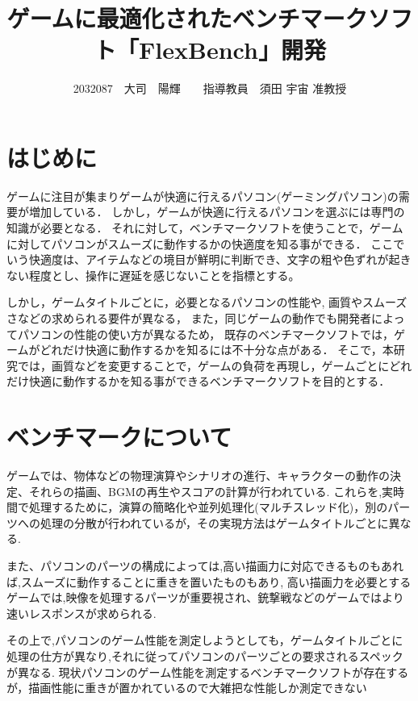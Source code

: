 \documentclass[twocolumn,10pt,a4j]{ltjsarticle}
\title{ゲームに最適化されたベンチマークソフト「FlexBench」開発}
\author{2032087　大司　陽輝　　指導教員　須田 宇宙 准教授}
\date{}
\begin{document}
\maketitle

\section{はじめに}

ゲームに注目が集まりゲームが快適に行えるパソコン(ゲーミングパソコン)の需要が増加している．
しかし，ゲームが快適に行えるパソコンを選ぶには専門の知識が必要となる．
それに対して，ベンチマークソフトを使うことで，ゲームに対してパソコンがスムーズに動作するかの快適度を知る事ができる．
ここでいう快適度は、アイテムなどの境目が鮮明に判断でき、文字の粗や色ずれが起きない程度とし、操作に遅延を感じないことを指標とする。

しかし，ゲームタイトルごとに，必要となるパソコンの性能や, 画質やスムーズさなどの求められる要件が異なる，
また，同じゲームの動作でも開発者によってパソコンの性能の使い方が異なるため，
既存のベンチマークソフトでは，ゲームがどれだけ快適に動作するかを知るには不十分な点がある．
そこで，本研究では，画質などを変更することで，ゲームの負荷を再現し，ゲームごとにどれだけ快適に動作するかを知る事ができるベンチマークソフトを目的とする．

\section{ベンチマークについて}
ゲームでは、物体などの物理演算やシナリオの進行、キャラクターの動作の決定、それらの描画、BGMの再生やスコアの計算が行われている.
これらを,実時間で処理するために，演算の簡略化や並列処理化(マルチスレッド化)，別のパーツへの処理の分散が行われているが，その実現方法はゲームタイトルごとに異なる.

また、パソコンのパーツの構成によっては,高い描画力に対応できるものもあれば,スムーズに動作することに重きを置いたものもあり,
高い描画力を必要とするゲームでは,映像を処理するパーツが重要視され、銃撃戦などのゲームではより速いレスポンスが求められる.

その上で,パソコンのゲーム性能を測定しようとしても，ゲームタイトルごとに処理の仕方が異なり,それに従ってパソコンのパーツごとの要求されるスペックが異なる.
現状パソコンのゲーム性能を測定するベンチマークソフトが存在するが，描画性能に重きが置かれているので大雑把な性能しか測定できない
\end{document}
